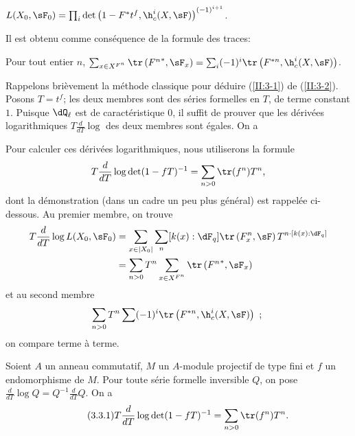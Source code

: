 \begin{theorem_}\label{II:3-1}
$L(X_0,\sF_0) = \prod_i \det\left(1-F^* t^f, \h_c^i(X,\sF)\right)^{(-1)^{i+1}}$. 
\end{theorem_}

Il est obtenu comme conséquence de la formule des traces:





\begin{theorem_}\label{II:3-2}
Pour tout entier $n$, 
$\sum_{x\in X^{F^n}} \tr\left({F^n}^*,\sF_x\right) = \sum_i (-1)^i \tr\left(F^{*n},\h_c^i(X,\sF)\right)$. 
\end{theorem_}





Rappelons brièvement la méthode classique pour déduire (\ref{II:3-1}) 
de (\ref{II:3-2}). Posons $T=t^f$; les deux membres sont des séries formelles 
en $T$, de terme constant $1$. Puisque $\dQ_\ell$ est de caractéristique 
$0$, il suffit de prouver que les dérivées logarithmiques 
$T\frac{d}{dT}\log$ des deux membres sont égales. On a 

Pour calculer ces dérivées logarithmiques, nous utiliserons la formule 
\[
  T \frac{d}{dT}\log\det(1-f T)^{-1} = \sum_{n>0} \tr(f^n) T^n \text{,}
\]
dont la démonstration (dans un cadre un peu plus général) est rappelée 
ci-dessous. Au premier membre, on trouve 
\begin{align*}
  T\frac{d}{dT}\log L(X_0,\sF_0) 
    &= \sum_{x\in |X_0|} \sum_n [k(x):\dF_q] \tr\left(F_x^n,\sF\right) T^{n\cdot[k(x):\dF_q]} \\
    &= \sum_{n>0} T^n \sum_{x\in X^{F^n}} \tr\left({F^n}^*,\sF_x\right)
\end{align*}
et au second membre 
\[
  \sum_{n>0} T^n \sum (-1)^i \tr\left(F^{*n},\h_c^i(X,\sF)\right) \text{ ; }
\]
on compare terme à terme. 





\begin{proposition_}\label{II:3-3}
Soient $A$ un anneau commutatif, $M$ un $A$-module projectif de type fini et 
$f$ un endomorphisme de $M$. Pour toute série formelle inversible $Q$, on pose 
$\frac{d}{dT}\log Q = Q^{-1}\frac{d}{dT}Q$. On a 
\begin{equation*}\tag{3.3.1}\label{II:eq:3-3-1}
  T\frac{d}{dT}\log\det(1-f T)^{-1} = \sum_{n>0} \tr(f^n) T^n \text{.}
\end{equation*}
\end{proposition_}

